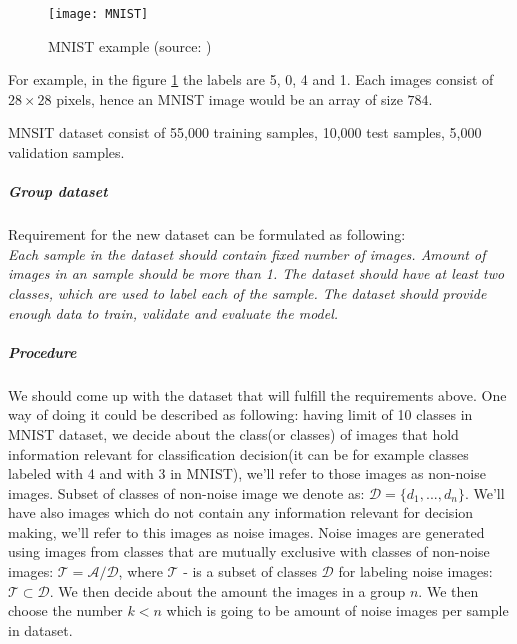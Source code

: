 \begin{figure}[h!]
	\texttt{[image: MNIST]}
	\caption{MNIST example (source: \cite{tensorFlowSite})}
	\label{fig:mnist}
\end{figure}

For example, in the figure \ref{fig:mnist} the labels are 5, 0, 4 and 1.
Each images consist of $28\times28$ pixels, hence an MNIST image would
be an array of size $784$.

MNSIT dataset consist of 55,000 training samples, 10,000 test samples, 5,000 validation samples.

\subparagraph{Group dataset}

Requirement for the new dataset can be formulated as following:\\
\textit{Each sample in the dataset should contain fixed number of images. Amount of images
in an sample should be more than 1. The dataset should have at least two classes,
which are used to label each of the sample. The dataset should provide enough
data to train, validate and evaluate the model.}



\subparagraph{Procedure}
We should come up with the dataset that will fulfill the requirements above.
One way of doing it could be described as following:
having limit of 10 classes in MNIST dataset, we decide about the class(or classes) of images
that hold information relevant for classification decision(it can be for example classes
labeled with 4 and with 3 in MNIST),
we'll refer to those images as non-noise images. Subset of classes of non-noise image
we denote as: $\mathcal{D} = \{d_1,..., d_n\}$.
We'll have also images which do not
contain any information relevant for decision making, we'll refer to this images
as noise images. Noise images are generated using images from classes that
are mutually exclusive with classes of non-noise images:
$\mathcal{T} = \mathcal{A} / \mathcal{D}$, where $\mathcal{T}$ - is a subset of classes $\mathcal{D}$
for labeling noise images: $\mathcal{T}\subset \mathcal{D}$.
We then decide about the amount the images in a group $n$.
We then choose the number $k < n $ which is going to be amount of noise images
per sample in dataset.

